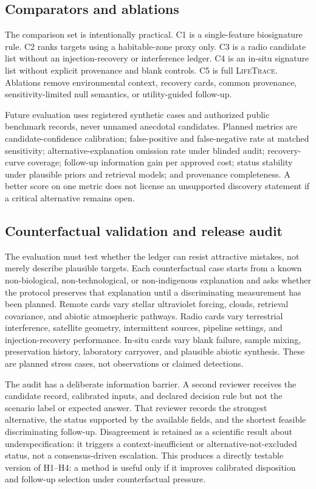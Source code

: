 \documentclass[conference]{IEEEtran}
\newcommand{\lifetrace}{\textsc{LifeTrace}}
\begin{document}
\subsection{Comparators and ablations}

The comparison set is intentionally practical. C1 is a single-feature biosignature rule. C2 ranks targets using a habitable-zone proxy only. C3 is a radio candidate list without an injection-recovery or interference ledger. C4 is an in-situ signature list without explicit provenance and blank controls. C5 is full \lifetrace{}. Ablations remove environmental context, recovery cards, common provenance, sensitivity-limited null semantics, or utility-guided follow-up.

Future evaluation uses registered synthetic cases and authorized public benchmark records, never unnamed anecdotal candidates. Planned metrics are candidate-confidence calibration; false-positive and false-negative rate at matched sensitivity; alternative-explanation omission rate under blinded audit; recovery-curve coverage; follow-up information gain per approved cost; status stability under plausible priors and retrieval models; and provenance completeness. A better score on one metric does not license an unsupported discovery statement if a critical alternative remains open.

\subsection{Counterfactual validation and release audit}

The evaluation must test whether the ledger can resist attractive mistakes, not merely describe plausible targets. Each counterfactual case starts from a known non-biological, non-technological, or non-indigenous explanation and asks whether the protocol preserves that explanation until a discriminating measurement has been planned. Remote cards vary stellar ultraviolet forcing, clouds, retrieval covariance, and abiotic atmospheric pathways. Radio cards vary terrestrial interference, satellite geometry, intermittent sources, pipeline settings, and injection-recovery performance. In-situ cards vary blank failure, sample mixing, preservation history, laboratory carryover, and plausible abiotic synthesis. These are planned stress cases, not observations or claimed detections.

The audit has a deliberate information barrier. A second reviewer receives the candidate record, calibrated inputs, and declared decision rule but not the scenario label or expected answer. That reviewer records the strongest alternative, the status supported by the available fields, and the shortest feasible discriminating follow-up. Disagreement is retained as a scientific result about underspecification: it triggers a context-insufficient or alternative-not-excluded status, not a consensus-driven escalation. This produces a directly testable version of H1--H4: a method is useful only if it improves calibrated disposition and follow-up selection under counterfactual pressure.
\end{document}
